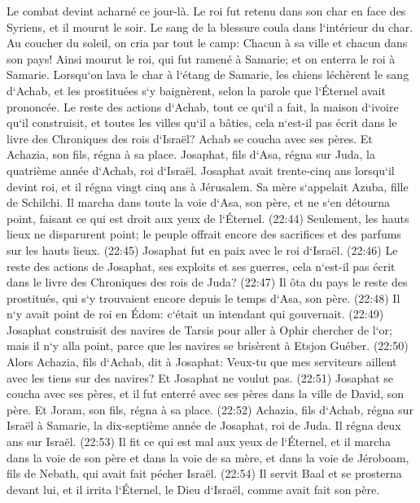 \verse Le combat devint acharné ce jour-là. Le roi fut retenu dans son char en face des Syriens, et il mourut le soir. Le sang de la blessure coula dans l`intérieur du char. 
\verse Au coucher du soleil, on cria par tout le camp: Chacun à sa ville et chacun dans son pays! 
\verse Ainsi mourut le roi, qui fut ramené à Samarie; et on enterra le roi à Samarie. 
\verse Lorsqu`on lava le char à l`étang de Samarie, les chiens léchèrent le sang d`Achab, et les prostituées s`y baignèrent, selon la parole que l`Éternel avait prononcée. 
\verse Le reste des actions d`Achab, tout ce qu`il a fait, la maison d`ivoire qu`il construisit, et toutes les villes qu`il a bâties, cela n`est-il pas écrit dans le livre des Chroniques des rois d`Israël? 
\verse Achab se coucha avec ses pères. Et Achazia, son fils, régna à sa place. 
\verse Josaphat, fils d`Asa, régna sur Juda, la quatrième année d`Achab, roi d`Israël. 
\verse Josaphat avait trente-cinq ans lorsqu`il devint roi, et il régna vingt cinq ans à Jérusalem. Sa mère s`appelait Azuba, fille de Schilchi. 
\verse Il marcha dans toute la voie d`Asa, son père, et ne s`en détourna point, faisant ce qui est droit aux yeux de l`Éternel. (22:44) Seulement, les hauts lieux ne disparurent point; le peuple offrait encore des sacrifices et des parfums sur les hauts lieux. 
\verse (22:45) Josaphat fut en paix avec le roi d`Israël. 
\verse (22:46) Le reste des actions de Josaphat, ses exploits et ses guerres, cela n`est-il pas écrit dans le livre des Chroniques des rois de Juda? 
\verse (22:47) Il ôta du pays le reste des prostitués, qui s`y trouvaient encore depuis le temps d`Asa, son père. 
\verse (22:48) Il n`y avait point de roi en Édom: c`était un intendant qui gouvernait. 
\verse (22:49) Josaphat construisit des navires de Tarsis pour aller à Ophir chercher de l`or; mais il n`y alla point, parce que les navires se brisèrent à Etsjon Guéber. 
\verse (22:50) Alors Achazia, fils d`Achab, dit à Josaphat: Veux-tu que mes serviteurs aillent avec les tiens sur des navires? Et Josaphat ne voulut pas. 
\verse (22:51) Josaphat se coucha avec ses pères, et il fut enterré avec ses pères dans la ville de David, son père. Et Joram, son fils, régna à sa place. 
\verse (22:52) Achazia, fils d`Achab, régna sur Israël à Samarie, la dix-septième année de Josaphat, roi de Juda. Il régna deux ans sur Israël. 
\verse (22:53) Il fit ce qui est mal aux yeux de l`Éternel, et il marcha dans la voie de son père et dans la voie de sa mère, et dans la voie de Jéroboam, fils de Nebath, qui avait fait pécher Israël. 
\verse (22:54) Il servit Baal et se prosterna devant lui, et il irrita l`Éternel, le Dieu d`Israël, comme avait fait son père. 
